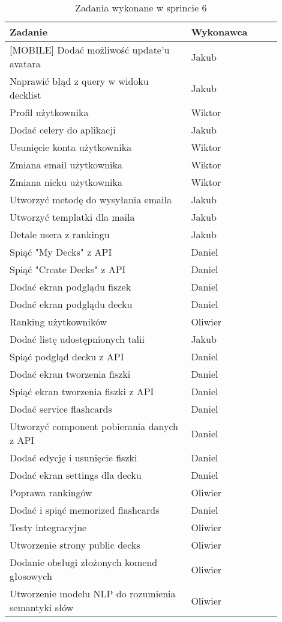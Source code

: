 \begin{longtable}{|p{0.6\linewidth}|p{0.3\linewidth}|}
\hline
\textbf{Zadanie} & \textbf{Wykonawca} \\
\hline
\endfirsthead

\hline


\hline
\endfoot

\caption{Zadania wykonane w sprincie 6}
\endlastfoot

[MOBILE] Dodać możliwość update'u avatara & Jakub \\
\hline
[MOBILE] Naprawić błąd z query w widoku decklist & Jakub \\
\hline
[WEB] Profil użytkownika & Wiktor \\
\hline
[BACKEND] Dodać celery do aplikacji & Jakub \\
\hline
[WEB] Usunięcie konta użytkownika & Wiktor \\
\hline
[WEB] Zmiana email użytkownika & Wiktor \\
\hline
[WEB] Zmiana nicku użytkownika & Wiktor \\
\hline
[BACKEND] Utworzyć metodę do wysyłania emaila & Jakub \\
\hline
[BACKEND] Utworzyć templatki dla maila & Jakub \\
\hline
[MOBILE] Detale usera z rankingu & Jakub \\
\hline
[MOBILE] Spiąć "My Decks" z API & Daniel \\
\hline
[MOBILE] Spiąć "Create Decks" z API & Daniel \\
\hline
[MOBILE] Dodać ekran podglądu fiszek & Daniel \\
\hline
[MOBILE] Dodać ekran podglądu decku & Daniel \\
\hline
[WEB] Ranking użytkowników & Oliwier \\
\hline
[MOBILE] Dodać listę udostępnionych talii & Jakub \\
\hline
[MOBILE] Spiąć podgląd decku z API & Daniel \\
\hline
[MOBILE] Dodać ekran tworzenia fiszki & Daniel \\
\hline
[MOBILE] Spiąć ekran tworzenia fiszki z API & Daniel \\
\hline
[MOBILE] Dodać service flashcards & Daniel \\
\hline
[MOBILE] Utworzyć component pobierania danych z API & Daniel \\
\hline
[MOBILE] Dodać edycję i usunięcie fiszki & Daniel \\
\hline
[MOBILE] Dodać ekran settings dla decku & Daniel \\
\hline
[WEB] Poprawa rankingów & Oliwier \\
\hline
[MOBILE] Dodać i spiąć memorized flashcards & Daniel \\
\hline
[BACKEND] Testy integracyjne & Oliwier \\
\hline
[WEB] Utworzenie strony public decks & Oliwier \\
\hline
[WEB] Dodanie obsługi złożonych komend głosowych & Oliwier \\
\hline
[BACKEND] Utworzenie modelu NLP do rozumienia semantyki słów & Oliwier \\
\hline

\end{longtable}